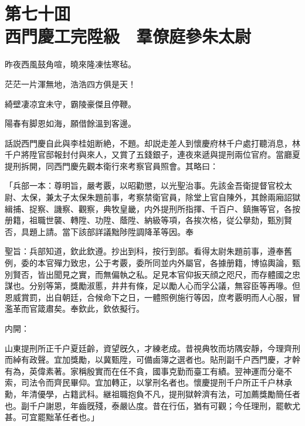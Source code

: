 
\chapter*{第七十囬　\\西門慶工完陞級　羣僚庭參朱太尉}


\begin{myquote}
昨夜西風鼓角喧，曉來隆凍怯寒毡。

茫茫一片渾無地，浩浩四方俱是天！

綺壁凄凉宜未守，霸陵豪傑且停鞭。

陽春有脚恩如海，願借餘溫到客邊。
\end{myquote}

話説西門慶自此與李桂姐断絶，不題。却説走差人到懷慶府林千户處打聽消息，林千户將陞官邸報封付與來人，又賞了五錢銀子，連夜來遞與提刑兩位官府。當廳夏提刑拆開，同西門慶先觀本衛行來考察官員照會。其略曰：

\begin{myquote}[\markfont]
「兵部一本：尊明旨，嚴考覈，以昭勸懲，以光聖治事。先該金吾衛提督官校太尉、太保，兼太子太保朱題前事，考察禁衛官員，除堂上官自陳外，其餘兩廂詔獄緝捕、捉察、譏察、觀察，典牧皇畿，内外提刑所指揮、千百户、鎮撫等官，各按册籍，祖職世襲、轉陞、功陞、蔭陞、納級等項，各挨次格，従公擧劾，甄別賢否，具題上請。當下該部詳議黜陟陞調降革等因。奉

聖旨：兵部知道，欽此欽遵。抄出到科，按行到部。看得太尉朱題前事，遵奉舊例，委的本官殫力致忠，公于考覈，委所同並内外屬官，各據册籍，博協輿論，甄別賢否，皆出聞見之實，而無偏執之私。足見本官仰扳天顔之咫尺，而存體國之忠謀也。分别等第，獎勵淑慝，井井有條，足以勵人心而孚公議，無容臣等再喙。但恩威賞罰，出自朝廷，合候命下之日，一體照例施行等因，庶考覈明而人心服，冒濫革而官箴肅矣。奉欽此，欽依擬行。

内開：

山東提刑所正千户夏廷齡，資望旣久，才練老成。昔視典牧而坊隅安靜，今理齊刑而綽有政聲。宜加獎勵，以冀甄陞，可備鹵簿之選者也。貼刑副千户西門慶，才幹有為，英偉素著。家稱殷實而在任不貪，國事克勤而臺工有績。翌神運而分毫不索，司法令而齊民畢仰。宜加轉正，以掌刑名者也。懷慶提刑千户所正千户林承勳，年清優學，占籍武科。継祖職抱負不凡，提刑獄幹濟有法，可加薦獎勵簡任者也。副千户謝恩，年齒旣殘，泰嚴亾度。昔在行伍，猶有可觀；今任理刑，罷軟尤甚。可宜罷黜革任者也。」
\end{myquote}

